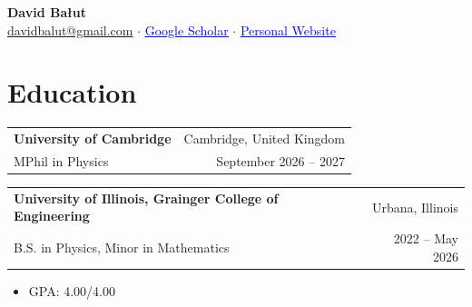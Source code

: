 \documentclass[10pt, letterpaper]{article}
\begin{document}
\vspace{-20pt}
\begin{center}
    {\LARGE \textbf{David Bałut}} \\
    \vspace{2pt}
    \href{mailto:davidbalut@gmail.com}{davidbalut@gmail.com} $\cdot$ \href{https://scholar.google.com/citations?user=3pZLDeAAAAAJ&hl=en&oi=ao}{\textcolor{blue}{\underline{Google Scholar}}} $\cdot$ \href{https://david-balut.github.io}{\textcolor{blue}{\underline{Personal Website}}}
\end{center}

\section{Education}
\begin{tabularx}{\textwidth}{X r}
\textbf{University of Cambridge} & Cambridge, United Kingdom \\
MPhil in Physics & September 2026 -- 2027 \\
\end{tabularx}
\vspace{4pt}
\begin{tabularx}{\textwidth}{X r}
\textbf{University of Illinois, Grainger College of Engineering} & Urbana, Illinois \\
B.S. in Physics, Minor in Mathematics & 2022 -- May 2026 \\
\end{tabularx}
\vspace{2pt}
\begin{itemize}[leftmargin=20pt, topsep=0pt, itemsep=2pt]
\item[] GPA: 4.00/4.00
\end{itemize}

\end{document}
